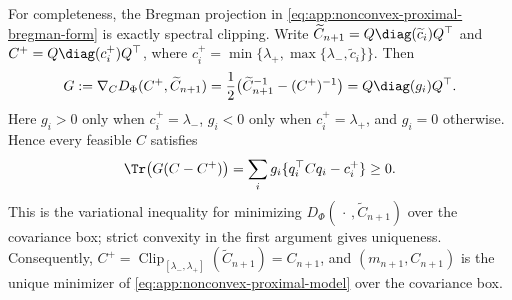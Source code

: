 For completeness, the Bregman projection in
\eqref{eq:app:nonconvex-proximal-bregman-form} is exactly spectral clipping.
Write
\(\widetilde C_{n+1}=Q\diag(\widetilde c_i)Q^\top\) and
\(C^+=Q\diag(c_i^+)Q^\top\), where
\(c_i^+=\min\{\lambda_+,\max\{\lambda_-,\widetilde c_i\}\}\).  Then
\[
  G:=\nabla_C D_\Phi(C^+,\widetilde C_{n+1})
  =\frac12\bigl(\widetilde C_{n+1}^{-1}-(C^+)^{-1}\bigr)
  =Q\diag(g_i)Q^\top.
\]
Here \(g_i>0\) only when \(c_i^+=\lambda_-\), \(g_i<0\) only when
\(c_i^+=\lambda_+\), and \(g_i=0\) otherwise.  Hence every feasible
\(C\) satisfies
\[
  \Tr\!\left(G(C-C^+)\right)
  =\sum_i g_i\{q_i^\top Cq_i-c_i^+\}\geq0.
\]
This is the variational inequality for minimizing
\(D_\Phi(\,\cdot\,,\widetilde C_{n+1})\) over the covariance box; strict
convexity in the first argument gives uniqueness.  Consequently,
\(C^+=\operatorname{Clip}_{[\lambda_-,\lambda_+]}
(\widetilde C_{n+1})=C_{n+1}\), and
\((m_{n+1},C_{n+1})\) is the unique minimizer of
\eqref{eq:app:nonconvex-proximal-model} over the covariance box.

